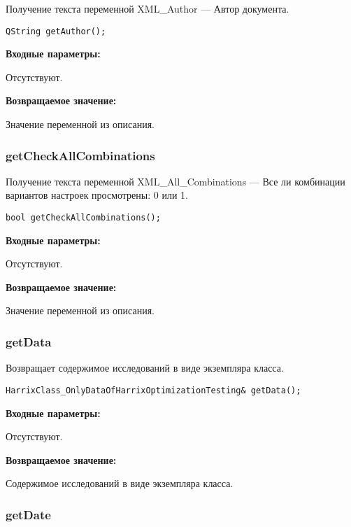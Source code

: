 Получение текста переменной XML\_Author --- Автор документа.


\begin{lstlisting}[label=code_syntax_getAuthor,caption=Синтаксис]
QString getAuthor();
\end{lstlisting}

\textbf{Входные параметры:}

Отсутствуют.

\textbf{Возвращаемое значение:}

Значение переменной из описания.


\subsubsection{getCheckAllCombinations}\label{getCheckAllCombinations}

Получение текста переменной  XML\_All\_Combinations --- Все ли комбинации вариантов настроек просмотрены: 0 или 1.


\begin{lstlisting}[label=code_syntax_getCheckAllCombinations,caption=Синтаксис]
bool getCheckAllCombinations();
\end{lstlisting}

\textbf{Входные параметры:}

Отсутствуют.

\textbf{Возвращаемое значение:}

Значение переменной из описания.


\subsubsection{getData}\label{getData}

Возвращает содержимое исследований в виде экземпляра класса.


\begin{lstlisting}[label=code_syntax_getData,caption=Синтаксис]
HarrixClass_OnlyDataOfHarrixOptimizationTesting& getData();
\end{lstlisting}

\textbf{Входные параметры:}

Отсутствуют.

\textbf{Возвращаемое значение:}

Содержимое исследований в виде экземпляра класса.


\subsubsection{getDate}\label{getDate}

